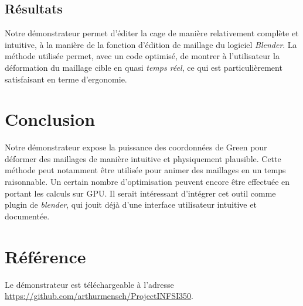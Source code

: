 \documentclass[10pt,a4paper]{article}
\begin{document}
\subsection{Résultats}

Notre démonstrateur permet d'éditer la cage de manière relativement complète et intuitive, à la manière de la fonction d'édition de maillage du logiciel \textit{Blender}. La méthode utilisée permet, avec un code optimisé, de montrer à l'utilisateur la déformation du maillage cible en quasi \emph{temps réel}, ce qui est particulièrement satisfaisant en terme d'ergonomie.

\section*{Conclusion}

Notre démonstrateur expose la puissance des coordonnées de Green pour déformer des maillages de manière intuitive et physiquement plausible. Cette méthode peut notamment être utilisée pour animer des maillages en un temps raisonnable. Un certain nombre d'optimisation peuvent encore être effectuée en portant les calculs sur GPU. Il serait intéressant d'intégrer cet outil comme plugin de \textit{blender}, qui jouit déjà d'une interface utilisateur intuitive et documentée.

\section*{Référence}

Le démonstrateur est téléchargeable à l'adresse \url{https://github.com/arthurmensch/ProjectINFSI350}.




\end{document}
